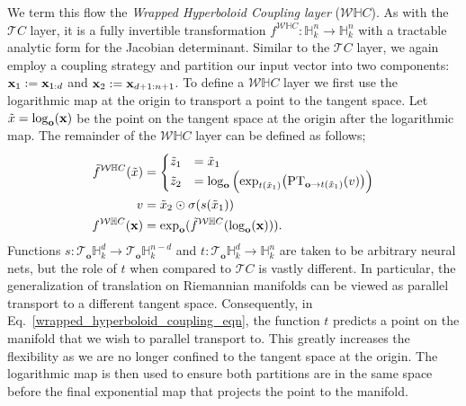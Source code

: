 We term this flow the {\em Wrapped Hyperboloid Coupling layer} ($\mathcal{W}\mathbb{H}C$).
As with the $\mathcal{T}C$ layer, it is a fully invertible transformation $f^{\mathcal{W}\mathbb{H}C}: \mathbb{H}^n_k \to \mathbb{H}^n_k$ with a tractable analytic form for the Jacobian determinant. 
Similar to the $\mathcal{T}C$ layer, we again employ a coupling strategy and partition our input vector into two components: $\mathbf{x}_1:=\mathbf{x}_{1:d}$ and $\mathbf{x}_2:=\mathbf{x}_{d+1:n+1}$.
To define a $\mathcal{W}\mathbb{H}C$ layer we first use the logarithmic map at the origin to transport a point to the tangent space. Let $\tilde{x} = \log_{\textbf{o}}(\mathbf{x})$ be the point on the tangent space at the origin after the logarithmic map. 
The remainder of the $\mathcal{W}\mathbb{H}C$ layer can be defined as follows;
\begin{align}
\label{wrapped_hyperboloid_coupling_eqn}
\tilde{f}^{\mathcal{W}\mathbb{H}C}(\tilde{x})&=
     \begin{cases}
     \tilde{z}_{1} &= \tilde{x}_{1}  \\
     \tilde{z}_{2} &= \log_{\textbf{o}}\Big( \textnormal{exp}_{t(\tilde{x}_{1})}\big(\textnormal{PT}_{\textbf{o}\to t(\tilde{x}_{1}) }(v)\big)\Big) \nonumber
    \end{cases}\\
    v &= \tilde{x}_{2} \odot \sigma(s(\tilde{x}_{1})) \nonumber \\
    f^{\mathcal{W}\mathbb{H}C}(\mathbf{x}) &=  \textnormal{exp}_{\textbf{o}}(\tilde{f}^{\mathcal{W}\mathbb{H}C}(\log_{\textbf{o}}(\mathbf{x}))).
\end{align}
Functions $s: \mathcal{T}_{\textbf{o}}\mathbb{H}^{d}_k \to \mathcal{T}_{\textbf{o}}\mathbb{H}^{n-d}_k$ and $t:\mathcal{T}_{\textbf{o}}\mathbb{H}^{d}_k \to \mathbb{H}^n_k$ are taken to be arbitrary neural nets, but the role of $t$ when compared to $\mathcal{T}C$ is vastly different. In particular, the generalization of translation on Riemannian manifolds can be viewed as parallel transport to a different tangent space. Consequently, in Eq.~\ref{wrapped_hyperboloid_coupling_eqn}, the function $t$ predicts a point on the manifold that we wish to parallel transport to.
This greatly increases the flexibility as we are no longer confined to the tangent space at the origin. The logarithmic map is then used to ensure both partitions are in the same space before the final exponential map that projects the point to the manifold.


